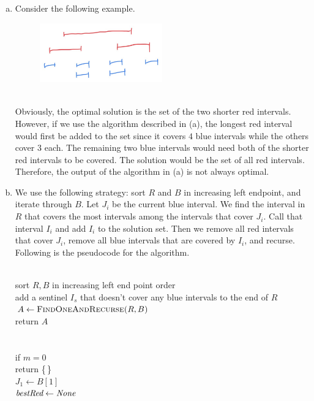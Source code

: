 \documentclass[11pt]{article}
\begin{document}
\begin{solution}
\begin{enumerate}[(a)]
\item Consider the following example.
\begin{figure}[h]
  \centering
  \includegraphics[width=0.5\textwidth]{hw10_2a.jpg}
\end{figure}\\
Obviously, the optimal solution is the set of the two shorter red intervals. However, if we use the algorithm described in (a), the longest red interval would first be added to the set since it covers $4$ blue intervals while the others cover $3$ each. The remaining two blue intervals would need both of the shorter red intervals to be covered. The solution would be the set of all red intervals. Therefore, the output of the algorithm in (a) is not always optimal.
\item We use the following strategy: sort $R$ and $B$ in increasing left endpoint, and iterate through $B$. Let $J_i$ be the current blue interval. We find the interval in $R$ that covers the most intervals among the intervals that cover $J_i$. Call that interval $I_i$ and add $I_i$ to the solution set. Then we remove all red intervals that cover $J_i$, remove all blue intervals that are covered by $I_i$, and recurse. Following is the pseudocode for the algorithm.
\begin{algo}
	\textsc{}\+
\\	sort $R, B$ in increasing left end point order
\\	add a sentinel $I_s$ that doesn't cover any blue intervals to the end of $R$
\\	$A\gets \textsc{FindOneAndRecurse($R, B$)}$
\\	return $A$\-
\\
\\	\textsc{}\+
\\	if $m=0$\+
\\	return \{\,\}\-
\\	$J_1\gets B[1]$
\\	$\emph{bestRed}\gets \emph{None}$

\end{algo}
\end{enumerate}
\end{solution}
\end{document}
